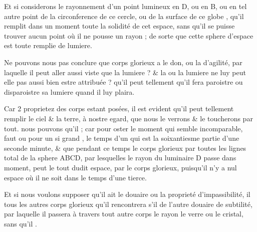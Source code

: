 \documentclass[11pt,a4paper]{article}
\begin{document}
Et si   considerons le rayonnement d'un point lumineux en D, ou en B, ou en tel autre point de la circonference de ce cercle, ou de la surface de ce globe \struck{\ill{}} , qu'il remplit dans un moment toute la solidité de cet espace, sans qu'il se puisse trouver aucun point où il ne pousse un rayon ; de sorte que cette sphere d'espace est toute remplie de lumiere.

Ne pouvons nous pas conclure que  corps glorieux a le don, ou la  d'agilité, par laquelle il peut aller aussi viste que la lumiere ? \& \struck{\ill{}} la  ou la lumiere ne luy peut elle pas aussi bien estre attribuée ?  \struck{\ill{}} qu'il peut \struck{\ill{}} tellement \uncertain{\ill{}} qu'il fera paroistre ou disparoistre sa lumiere quand il luy plaira.

Car 2 \struck{\ill{}} proprietez des corps  estant posées, il est evident \struck{\ill{}} qu'il peut \struck{\ill{}} tellement remplir le ciel \& la terre, à nostre egard, que nous le verrons \& le toucherons par tout. \add{\ill{}} nous pouvons  qu'il \add{\ill{}} \struck{\ill{}}   ; car pour oster le moment qui semble incomparable,  faut  ou \ill{} pour  un si grand ,  \struck{\ill{}} le temps d'un  \ill{} qui est la soixantiesme partie d'une seconde minute, \& que \struck{\ill{}} pendant ce temps le corps glorieux \struck{\ill{}}  par toutes les lignes  total de la sphere ABCD, par lesquelles le rayon du luminaire D passe dans  moment,  peut  le tout dudit espace,   par le corps glorieux, puisqu'il n'y a nul espace où il ne soit dans le temps d'une tierce.



Et si nous voulons supposer qu'il ait le douaire ou la proprieté d'impassibilité, il \struck{\ill{}}   \ill{} tous les autres corps \struck{\ill{}} glorieux qu'il rencontrera s'il  de l'autre douaire de subtilité, par laquelle il passera à travers tout autre \struck{\ill{}} corps  le rayon   le verre ou le cristal, sans qu'il \struck{\ill{}} .
\end{document}
